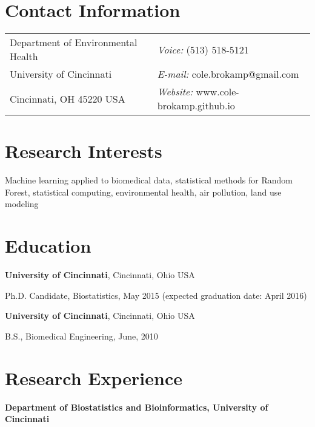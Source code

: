\documentclass[margin,line]{res}
\newenvironment{list1}{
  \begin{list}{\ding{113}}{%
      \setlength{\itemsep}{0in}
      \setlength{\parsep}{0in} \setlength{\parskip}{0in}
      \setlength{\topsep}{0in} \setlength{\partopsep}{0in} 
      \setlength{\leftmargin}{0.17in}}}{\end{list}}
\begin{document}

\begin{resume}
\section{\sc Contact Information}
\vspace{.05in}
\begin{tabular}{@{}p{3in}p{4in}}      
Department of Environmental Health  & {\it Voice:}  (513) 518-5121 \\         
University of Cincinnati & {\it E-mail:}  cole.brokamp@gmail.com\\       
Cincinnati, OH 45220 USA  & {\it Website:} www.cole-brokamp.github.io \\     
\end{tabular}


\section{\sc Research Interests}
Machine learning applied to biomedical data, statistical methods for Random Forest,
statistical computing, environmental health, air pollution, land use modeling

\section{\sc Education}
{\bf University of Cincinnati}, Cincinnati, Ohio USA \\
\vspace*{-.1in}
\begin{list1}
\item[]Ph.D. Candidate, Biostatistics, May 2015 (expected
  graduation date: April 2016)
\end{list1}

{\bf University of Cincinnati}, Cincinnati, Ohio USA\\
\vspace*{-.1in}
\begin{list1}
\item[]B.S., Biomedical Engineering,  June, 2010
\end{list1}


\section{\sc Research Experience}
\textbf{Department of Biostatistics and Bioinformatics, University of Cincinnati} \\


\end{resume}
\end{document}
